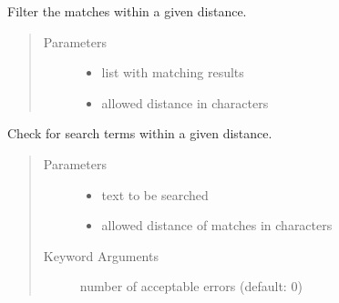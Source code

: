 \documentclass[letterpaper,10pt,english]{sphinxmanual}
\begin{document}
\begin{fulllineitems}
\begin{fulllineitems}
\end{fulllineitems}


\begin{fulllineitems}
\label{\detokenize{api:simple_check.SimpleCheck.lst_distance}}
Filter the matches within a given distance.
\begin{quote}\begin{description}
\item[{Parameters}] \leavevmode\begin{itemize}
\item {} 
 \textendash{} list with matching results

\item {} 
 \textendash{} allowed distance in characters

\end{itemize}

\end{description}\end{quote}

\end{fulllineitems}


\begin{fulllineitems}
\label{\detokenize{api:simple_check.SimpleCheck.range_check_text}}
Check for search terms within a given distance.
\begin{quote}\begin{description}
\item[{Parameters}] \leavevmode\begin{itemize}
\item {} 
 \textendash{} text to be searched

\item {} 
 \textendash{} allowed distance of matches in characters

\end{itemize}

\item[{Keyword Arguments}] \leavevmode
{} \textendash{} number of acceptable errors (default: 0)


\end{description}
\end{quote}
\end{fulllineitems}
\end{fulllineitems}
\end{document}
